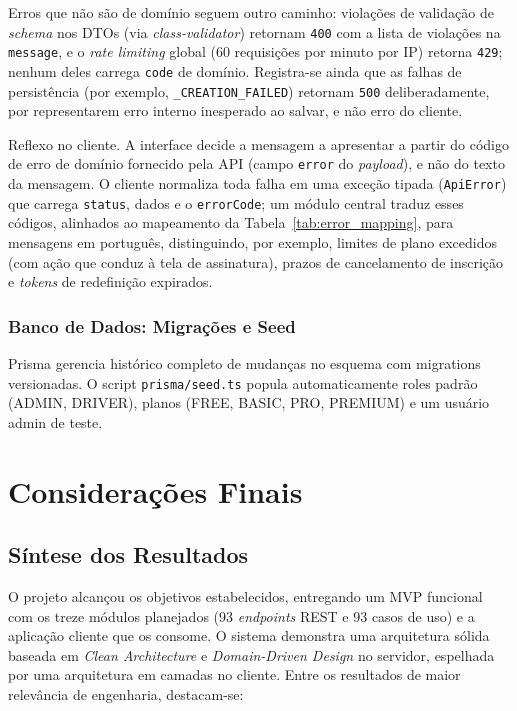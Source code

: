 \documentclass[12pt,openright,oneside,a4paper]{article}
\begin{document}
Erros que não são de domínio seguem outro caminho: violações de validação de \textit{schema} nos DTOs (via \textit{class-validator}) retornam \texttt{400} com a lista de violações na \texttt{message}, e o \textit{rate limiting} global (60 requisições por minuto por IP) retorna \texttt{429}; nenhum deles carrega \texttt{code} de domínio. Registra-se ainda que as falhas de persistência (por exemplo, \texttt{\_CREATION\_FAILED}) retornam \texttt{500} deliberadamente, por representarem erro interno inesperado ao salvar, e não erro do cliente.

Reflexo no cliente. A interface decide a mensagem a apresentar a partir do código de erro de domínio fornecido pela API (campo \texttt{error} do \textit{payload}), e não do texto da mensagem. O cliente normaliza toda falha em uma exceção tipada (\texttt{ApiError}) que carrega \texttt{status}, dados e o \texttt{errorCode}; um módulo central traduz esses códigos, alinhados ao mapeamento da Tabela~\ref{tab:error_mapping}, para mensagens em português, distinguindo, por exemplo, limites de plano excedidos (com ação que conduz à tela de assinatura), prazos de cancelamento de inscrição e \textit{tokens} de redefinição expirados.

\subsubsection{Banco de Dados: Migrações e Seed}
\label{subsec:migracoes}

Prisma gerencia histórico completo de mudanças no esquema com migrations versionadas. O script \texttt{prisma/seed.ts} popula automaticamente roles padrão (ADMIN, DRIVER), planos (FREE, BASIC, PRO, PREMIUM) e um usuário admin de teste.



\section{Considerações Finais}
\label{sec:consideracoes}

\subsection{Síntese dos Resultados}

O projeto alcançou os objetivos estabelecidos, entregando um MVP funcional com os treze módulos planejados (93 \textit{endpoints} REST e 93 casos de uso) e a aplicação cliente que os consome. O sistema demonstra uma arquitetura sólida baseada em \textit{Clean Architecture} e \textit{Domain-Driven Design} no servidor, espelhada por uma arquitetura em camadas no cliente. Entre os resultados de maior relevância de engenharia, destacam-se:
\end{document}
